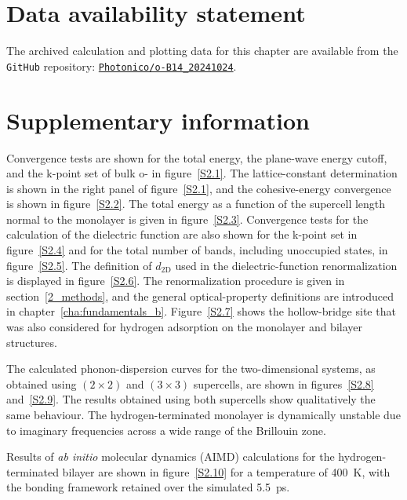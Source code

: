\clearpage
\section{Data availability statement}

The archived calculation and plotting data for this chapter are available from the \texttt{GitHub} repository:
\href{https://github.com/Photonico/o-B14_20241024}{\texttt{Photonico/o-B14\_20241024}}.

\section{Supplementary information}
\label{2_supplementary}

Convergence tests are shown for the total energy, the plane-wave energy cutoff,
and the k-point set of bulk o- in figure~\ref{S2.1}.
The lattice-constant determination is shown in the right panel of figure~\ref{S2.1},
and the cohesive-energy convergence is shown in figure~\ref{S2.2}.
The total energy as a function of the supercell length normal to the monolayer is given in figure~\ref{S2.3}.
Convergence tests for the calculation of the dielectric function are also shown for the k-point set in figure~\ref{S2.4}
and for the total number of bands, including unoccupied states, in figure~\ref{S2.5}.
The definition of $d_{\mathrm{2D}}$ used in the dielectric-function renormalization is displayed in figure~\ref{S2.6}.
The renormalization procedure is given in section~\ref{2_methods},
and the general optical-property definitions are introduced in chapter~\ref{cha:fundamentals_b}.
Figure~\ref{S2.7} shows the hollow-bridge site that was also considered for hydrogen adsorption on the monolayer and bilayer structures.

The calculated phonon-dispersion curves for the two-dimensional systems,
as obtained using $(2 \times 2)$ and $(3 \times 3)$ supercells, are shown in figures~\ref{S2.8} and~\ref{S2.9}.
The results obtained using both supercells show qualitatively the same behaviour.
The hydrogen-terminated monolayer is dynamically unstable due to imaginary frequencies across a wide range of the Brillouin zone.

Results of \textit{ab initio} molecular dynamics (AIMD) calculations for the hydrogen-terminated bilayer are shown in figure~\ref{S2.10} for a temperature of \qty{400}{K}, with the bonding framework retained over the simulated \qty{5.5}{ps}.

